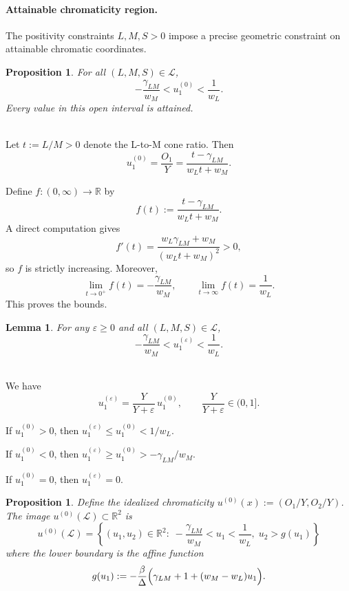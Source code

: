 \documentclass[11pt]{article}
\makeatletter
\theoremstyle{plain}
\newtheorem{proposition}[theorem]{Proposition}
\newtheorem{lemma}[theorem]{Lemma}
\theoremstyle{definition}
\theoremstyle{remark}
\renewenvironment{proof}[1][\proofname]{\par\pushQED{\qed}\normalfont
\topsep6\p@\@plus6\p@\relax
\trivlist\item[\hskip\labelsep\bfseries #1\@addpunct{.}]\mbox{}\\\ignorespaces}{\popQED\endtrivlist\@endpefalse}
\newcommand{\R}{\mathbb{R}}
\makeatother
\begin{document}
\paragraph{Attainable chromaticity region.}

The positivity constraints $L, M, S > 0$ impose a precise geometric constraint on attainable chromatic coordinates.

\begin{proposition}
\label{prop:u1-bounds}
For all $(L, M, S) \in \mathcal{L}$,
\begin{equation}
-\frac{\gamma_{LM}}{w_M} < u_1^{(0)} < \frac{1}{w_L}.
\end{equation}
Every value in this open interval is attained.
\end{proposition}

\begin{proof}
\noindent Let $t := L/M > 0$ denote the L-to-M cone ratio. Then
\[
 u_1^{(0)} = \frac{O_1}{Y} = \frac{t - \gamma_{LM}}{w_L t + w_M}.
\]

\noindent Define $f : (0,\infty) \to \R$ by
\[
 f(t) := \frac{t - \gamma_{LM}}{w_L t + w_M}.
\]
A direct computation gives
\[
 f'(t) = \frac{w_L\gamma_{LM} + w_M}{(w_L t + w_M)^2} > 0,
\]
so $f$ is strictly increasing. Moreover,
\[
 \lim_{t \to 0^+} f(t) = -\frac{\gamma_{LM}}{w_M},
 \qquad
 \lim_{t \to \infty} f(t) = \frac{1}{w_L}.
\]
This proves the bounds.
\end{proof}

\begin{lemma}
\label{lem:u1-eps-bounds}
For any $\varepsilon \geq 0$ and all $(L, M, S) \in \mathcal{L}$,
\begin{equation}
-\frac{\gamma_{LM}}{w_M} < u_1^{(\varepsilon)} < \frac{1}{w_L}.
\end{equation}
\end{lemma}

\begin{proof}
\noindent We have
\[
 u_1^{(\varepsilon)} = \frac{Y}{Y+\varepsilon}\, u_1^{(0)},
 \qquad
 \frac{Y}{Y+\varepsilon} \in (0,1].
\]

\noindent If $u_1^{(0)} > 0$, then $u_1^{(\varepsilon)} \leq u_1^{(0)} < 1/w_L$.

\noindent If $u_1^{(0)} < 0$, then $u_1^{(\varepsilon)} \geq u_1^{(0)} > -\gamma_{LM}/w_M$.

\noindent If $u_1^{(0)} = 0$, then $u_1^{(\varepsilon)} = 0$.
\end{proof}

\begin{proposition}
\label{prop:attainable-eps0}
Define the idealized chromaticity $u^{(0)}(x) := (O_1/Y, O_2/Y)$. The image $u^{(0)}(\mathcal{L}) \subset \R^2$ is
\begin{equation}
\boxed{
u^{(0)}(\mathcal{L}) = \left\{(u_1,u_2) \in \R^2 :\; -\frac{\gamma_{LM}}{w_M} < u_1 < \frac{1}{w_L},\; u_2 > g(u_1) \right\}
}
\end{equation}
where the lower boundary is the affine function
\begin{equation}
g(u_1) := -\frac{\beta}{\Delta}\Bigl(\gamma_{LM}+1+(w_M-w_L)u_1\Bigr).
\end{equation}
\end{proposition}
\end{document}
